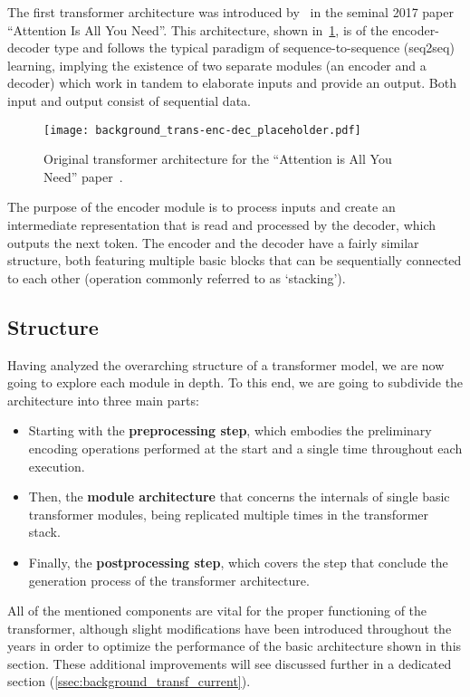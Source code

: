 The first transformer architecture was introduced by~\citet{vaswani2017} in the seminal 2017 paper ``Attention Is All You Need''.
This architecture, shown in~\cref{fig:background_trans-enc-dec}, is of the encoder-decoder type and follows the typical paradigm of sequence-to-sequence (seq2seq) learning, implying the existence of two separate modules (an encoder and a decoder) which work in tandem to elaborate inputs and provide an output.
Both input and output consist of sequential data.

\begin{figure}[t!]
    \centering
    \texttt{[image: background\_trans-enc-dec\_placeholder.pdf]}
    \caption{Original transformer architecture for the ``Attention is All You Need'' paper~\cite{vaswani2017}.}
    \label{fig:background_trans-enc-dec}
\end{figure}

The purpose of the encoder module is to process inputs and create an intermediate representation that is read and processed by the decoder, which outputs the next token.
The encoder and the decoder have a fairly similar structure, both featuring multiple basic blocks that can be sequentially connected to each other (operation commonly referred to as `stacking').

\subsection{Structure}\label{ssec:background_transf_structure}

Having analyzed the overarching structure of a transformer model, we are now going to explore each module in depth.
To this end, we are going to subdivide the architecture into three main parts:
\begin{itemize}
    \item Starting with the \textbf{preprocessing step}, which embodies the preliminary encoding operations performed at the start and a single time throughout each execution.
    \item Then, the \textbf{module architecture} that concerns the internals of single basic transformer modules, being replicated multiple times in the transformer stack.
    \item Finally, the \textbf{postprocessing step}, which covers the step that conclude the generation process of the transformer architecture.
\end{itemize}

All of the mentioned components are vital for the proper functioning of the transformer, although slight modifications have been introduced throughout the years in order to optimize the performance of the basic architecture shown in this section.
These additional improvements will see discussed further in a dedicated section (\cref{ssec:background_transf_current}).

